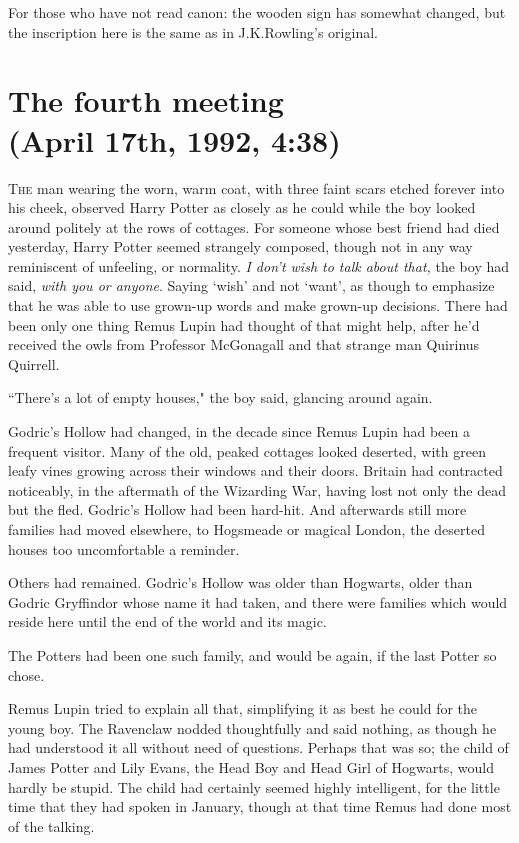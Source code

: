 
\begin{chapterOpeningAuthorNote}
For those who have not read canon: the wooden sign has somewhat changed, but the inscription here is the same as in J.\?K.\?Rowling's original.
\end{chapterOpeningAuthorNote}

\section{The fourth meeting\\
(April 17th, 1992, 4:38\pm)}

\lettrine{T}{he} man wearing the worn, warm coat, with three faint scars etched forever into his cheek, observed Harry Potter as closely as he could while the boy looked around politely at the rows of cottages. For someone whose best friend had died yesterday, Harry Potter seemed strangely composed, though not in any way reminiscent of unfeeling, or normality. \emph{I don't wish to talk about that,} the boy had said, \emph{with you or anyone}. Saying `wish' and not `want', as though to emphasize that he was able to use grown-up words and make grown-up decisions. There had been only one thing Remus Lupin had thought of that might help, after he'd received the owls from Professor McGonagall and that strange man Quirinus Quirrell.

``There's a lot of empty houses," the boy said, glancing around again.

Godric's Hollow had changed, in the decade since Remus Lupin had been a frequent visitor. Many of the old, peaked cottages looked deserted, with green leafy vines growing across their windows and their doors. Britain had contracted noticeably, in the aftermath of the Wizarding War, having lost not only the dead but the fled. Godric's Hollow had been hard-hit. And afterwards still more families had moved elsewhere, to Hogsmeade or magical London, the deserted houses too uncomfortable a reminder.

Others had remained. Godric's Hollow was older than Hogwarts, older than Godric Gryffindor whose name it had taken, and there were families which would reside here until the end of the world and its magic.

The Potters had been one such family, and would be again, if the last Potter so chose.

Remus Lupin tried to explain all that, simplifying it as best he could for the young boy. The Ravenclaw nodded thoughtfully and said nothing, as though he had understood it all without need of questions. Perhaps that was so; the child of James Potter and Lily Evans, the Head Boy and Head Girl of Hogwarts, would hardly be stupid. The child had certainly seemed highly intelligent, for the little time that they had spoken in January, though at that time Remus had done most of the talking.

